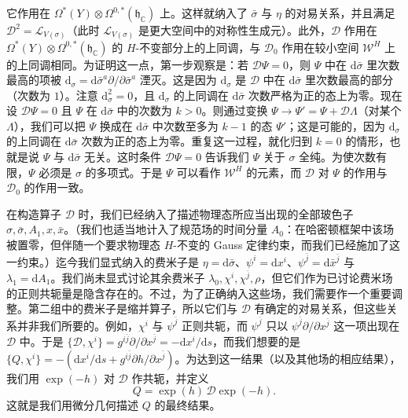 \documentclass[11pt,a4paper,UTF8]{ctexart}
\theoremstyle{plain}
\theoremstyle{definition}
\begin{document}
它作用在 $\Omega^*(Y)\otimes\Omega^{0,*}(\mathfrak h_{\mathbb C})$ 上。这样就纳入了 $\bar\sigma$ 与 $\eta$ 的对易关系，并且满足 $\mathcal D^2=\mathcal L_{V(\sigma)}$（此时 $\mathcal L_{V(\sigma)}$ 是更大空间中的对称性生成元）。此外，$\mathcal D$ 作用在 $\Omega^*(Y)\otimes\Omega^{0,*}(\mathfrak h_{\mathbb C})$ 的 $H$-不变部分上的上同调，与 $\mathcal D_0$ 作用在较小空间 $\mathcal W^H$ 上的上同调相同。为证明这一点，第一步观察是：若 $\mathcal D\Psi=0$，则 $\Psi$ 中在 $\mathrm d\bar\sigma$ 里次数最高的项被 $\mathrm d_\sigma=\mathrm d\bar\sigma^a\partial/\partial\bar\sigma^a$ 湮灭。这是因为 $\mathrm d_\sigma$ 是 $\mathcal D$ 中在 $\mathrm d\bar\sigma$ 里次数最高的部分（次数为 $1$）。注意 $\mathrm d_\sigma^2=0$，且 $\mathrm d_\sigma$ 的上同调在 $\mathrm d\bar\sigma$ 次数严格为正的态上为零。现在设 $\mathcal D\Psi=0$ 且 $\Psi$ 在 $\mathrm d\bar\sigma$ 中的次数为 $k>0$。则通过变换 $\Psi\to\Psi'=\Psi+\mathcal D\Lambda$（对某个 $\Lambda$），我们可以把 $\Psi$ 换成在 $\mathrm d\bar\sigma$ 中次数至多为 $k-1$ 的态 $\Psi'$；这是可能的，因为 $\mathrm d_\sigma$ 的上同调在 $\mathrm d\bar\sigma$ 次数为正的态上为零。重复这一过程，就化归到 $k=0$ 的情形，也就是说 $\Psi$ 与 $\mathrm d\bar\sigma$ 无关。这时条件 $\mathcal D\Psi=0$ 告诉我们 $\Psi$ 关于 $\sigma$ 全纯。为使次数有限，$\Psi$ 必须是 $\sigma$ 的多项式。于是 $\Psi$ 可以看作 $\mathcal W^H$ 的元素，而 $\mathcal D$ 对 $\Psi$ 的作用与 $\mathcal D_0$ 的作用一致。


在构造算子 $\mathcal D$ 时，我们已经纳入了描述物理态所应当出现的全部玻色子 $\sigma,\bar\sigma,A_1,x,\bar x$。（我们也适当地计入了规范场的时间分量 $A_0$：在哈密顿框架中该场被置零，但伴随一个要求物理态 $H$-不变的 Gauss 定律约束，而我们已经施加了这一约束。）迄今我们显式纳入的费米子是 $\eta=\mathrm d\bar\sigma$、$\psi^i=\mathrm dx^i$、$\psi^{\bar j}=\mathrm d\bar x^{\bar j}$ 与 $\lambda_1=\mathrm dA_1$。我们尚未显式讨论其余费米子 $\lambda_0,\chi^i,\chi^{\bar j},\rho$，但它们作为已讨论费米场的正则共轭量是隐含存在的。不过，为了正确纳入这些场，我们需要作一个重要调整。第二组中的费米子是缩并算子，所以它们与 $\mathcal D$ 有确定的对易关系，但这些关系并非我们所要的。例如，$\chi^i$ 与 $\psi^{\bar j}$ 正则共轭，而 $\psi^{\bar j}$ 只以 $\psi^{\bar j}\partial/\partial x^{\bar j}$ 这一项出现在 $\mathcal D$ 中。于是 $\{\mathcal D,\chi^i\}=g^{i\bar j}\partial/\partial x^{\bar j}=-\mathrm dx^i/\mathrm ds$，而我们想要的是 $\{Q,\chi^i\}=-(\mathrm dx^i/\mathrm ds+g^{i\bar j}\partial h/\partial x^{\bar j})$。为达到这一结果（以及其他场的相应结果），我们用 $\exp(-h)$ 对 $\mathcal D$ 作共轭，并定义
\begin{equation}
    Q=\exp(h)\,\mathcal D\exp(-h).
    \tag{5.22}
\end{equation}
这就是我们用微分几何描述 $Q$ 的最终结果。
\end{document}
